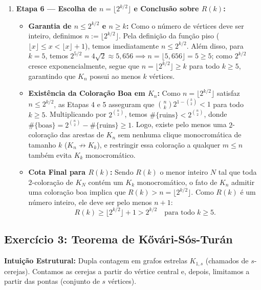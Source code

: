 \documentclass[11pt, a4paper]{article}
\begin{document}
\begin{enumerate}
    \item \textbf{Etapa 6 --- Escolha de $n = \lfloor 2^{k/2} \rfloor$ e Conclusão sobre $R(k)$:}
    \begin{itemize}
        \item \textbf{Garantia de $n \le 2^{k/2}$ e $n \ge k$:} Como o número de vértices deve ser inteiro, definimos $n := \lfloor 2^{k/2} \rfloor$. Pela definição da função piso ($\lfloor x \rfloor \le x < \lfloor x \rfloor + 1$), temos imediatamente $n \le 2^{k/2}$. Além disso, para $k = 5$, temos $2^{5/2} = 4\sqrt{2} \approx 5{,}656 \implies n = \lfloor 5{,}656 \rfloor = 5 \ge 5$; como $2^{k/2}$ cresce exponencialmente, segue que $n = \lfloor 2^{k/2} \rfloor \ge k$ para todo $k \ge 5$, garantindo que $K_n$ possui ao menos $k$ vértices.
        \item \textbf{Existência da Coloração Boa em $K_n$:} Como $n = \lfloor 2^{k/2} \rfloor$ satisfaz $n \le 2^{k/2}$, as Etapas 4 e 5 asseguram que $\binom{n}{k} 2^{1 - \binom{k}{2}} < 1$ para todo $k \ge 5$. Multiplicando por $2^{\binom{n}{2}}$, temos $\#\{\text{ruins}\} < 2^{\binom{n}{2}}$, donde $\#\{\text{boas}\} = 2^{\binom{n}{2}} - \#\{\text{ruins}\} \ge 1$. Logo, existe pelo menos uma $2$-coloração das arestas de $K_n$ sem nenhuma clique monocromática de tamanho $k$ ($K_n \not\to K_k$), e restringir essa coloração a qualquer $m \le n$ também evita $K_k$ monocromático.
        \item \textbf{Cota Final para $R(k)$:} Sendo $R(k)$ o menor inteiro $N$ tal que toda $2$-coloração de $K_N$ contém um $K_k$ monocromático, o fato de $K_n$ admitir uma coloração boa implica que $R(k) > n = \lfloor 2^{k/2} \rfloor$. Como $R(k)$ é um número inteiro, ele deve ser pelo menos $n + 1$:
        \[ R(k) \ge \lfloor 2^{k/2} \rfloor + 1 > 2^{k/2} \quad \text{para todo } k \ge 5. \]
    \end{itemize}
\end{enumerate}

\subsection*{Exercício 3: Teorema de Kővári-Sós-Turán}
\textbf{Intuição Estrutural:} Dupla contagem em grafos estrelas $K_{1,s}$ (chamados de $s$-cerejas). Contamos as cerejas a partir do vértice central e, depois, limitamos a partir das pontas (conjunto de $s$ vértices).
\end{document}
